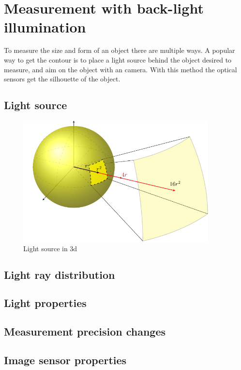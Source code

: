 \section{Measurement with back-light illumination}
To measure the size and form of an object there are multiple ways. A popular way to get the contour is to place a light source behind the object desired to measure, and aim on the object with an camera. With this method the optical sensors get the silhouette of the object. 
\subsection{Light source}


\begin{figure}[ht]
	\centering
	\includegraphics[width=0.9\textwidth]{2-theory/backlight/light.pdf}
	\caption{Light source in 3d\label{theory:light}}
\end{figure} 


\subsection{Light ray distribution}
\subsection{Light properties}
\subsection{Measurement precision changes}
\subsection{Image sensor properties}

